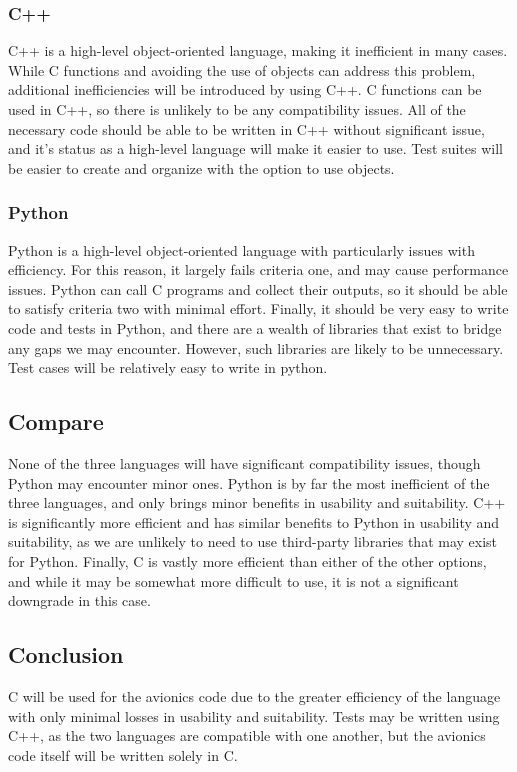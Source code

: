 \documentclass[onecolumn, draftclsnofoot,10pt, compsoc]{IEEEtran}
\begin{document}
\subsubsection{C++}
C++ is a high-level object-oriented language, making it inefficient in many cases. While C functions and avoiding the use of objects can address this problem, additional inefficiencies will be introduced by using C++. C functions can be used in C++, so there is unlikely to be any compatibility issues. All of the necessary code should be able to be written in C++ without significant issue, and it's status as a high-level language will make it easier to use. Test suites will be easier to create and organize with the option to use objects.

\subsubsection{Python}
Python is a high-level object-oriented language with particularly issues with efficiency. For this reason, it largely fails criteria one, and may cause performance issues. Python can call C programs and collect their outputs, so it should be able to satisfy criteria two with minimal effort. Finally, it should be very easy to write code and tests in Python, and there are a wealth of libraries that exist to bridge any gaps we may encounter. However, such libraries are likely to be unnecessary. Test cases will be relatively easy to write in python.

\subsection{Compare}
None of the three languages will have significant compatibility issues, though Python may encounter minor ones. Python is by far the most inefficient of the three languages, and only brings minor benefits in usability and suitability. C++ is significantly more efficient and has similar benefits to Python in usability and suitability, as we are unlikely to need to use third-party libraries that may exist for Python. Finally, C is vastly more efficient than either of the other options, and while it may be somewhat more difficult to use, it is not a significant downgrade in this case.

\subsection{Conclusion}
C will be used for the avionics code due to the greater efficiency of the language with only minimal losses in usability and suitability. Tests may be written using C++, as the two languages are compatible with one another, but the avionics code itself will be written solely in C.
\end{document}
